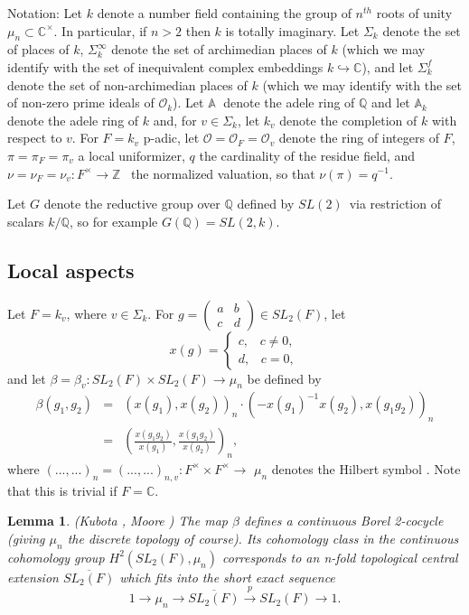 \documentclass[12pt]{article}
\numberwithin{equation}{section}
\newtheorem{lemma}[theorem]{Lemma}
\def\aaa{\mathbb{A}}
\def\qqq{\mathbb{Q}}
\def\ccc{\mathbb{C}}
\begin{document}
Notation: Let $k$ denote a number field containing the group of $n^{th}$
roots of unity $\mu _n\subset \ccc ^{\times }$. In particular, if $n>2$
then $k$ is totally imaginary. Let $\Sigma _k$ denote the set of places of $k
$, $\Sigma _k^\infty $ denote the set of archimedian places of $k$ (which we
may identify with the set of inequivalent complex embeddings $k\hookrightarrow 
\ccc $), and let $\Sigma _k^f$ denote the set of non-archimedian places of 
$k$ (which we may identify with the set of non-zero prime ideals of $%
{\mathcal{O}}_k$). Let $\aaa $ $\;$denote the adele ring of $\qqq$ and
let $\aaa _k$ denote the adele ring of $k$ and, for $v\in \Sigma _k$, let $%
k_v$ denote the completion of $k$ with respect to $v$. For $F=k_v$ p-adic,
let ${\mathcal{O}}={\mathcal{O}}_F={\mathcal{O}}_v$ denote the ring of integers of 
$F$, $\pi =\pi _F=\pi _v$ a local uniformizer, $q$ the cardinality of the
residue field, and $\nu =\nu _F=\nu _v:F^{\times }\rightarrow {\mathbb{Z}}$ \ the
normalized valuation, so that $\nu (\pi )=q^{-1}$.

Let $G$ denote the reductive group over $\qqq$ defined by $SL(2)$\ via
restriction of scalars $k/\qqq$, so for example $G(\qqq)=SL(2,k)$.

\subsection{Local aspects}\label{ssec:local}

Let $F=k_v$, where $v\in \Sigma _k$. For $g=\left( 
\begin{array}{cc}
a & b \\ 
c & d
\end{array}
\right) \in SL_2(F)$, let 
\[
x(g)=\left\{ 
\begin{array}{c}
c,\;\;\;c\neq 0, \\ 
d,\;\;\;c=0,
\end{array}
\right. 
\]
and let $\beta =\beta _v:SL_2(F)\times SL_2(F)\rightarrow \mu _n$ be defined
by 
\begin{eqnarray*}
\beta (g_1,g_2) &=&(x(g_1),x(g_2))_n\cdot (-x(g_1)^{-1}x(g_2),x(g_1g_2))_n \\
&=&(\frac{x(g_1g_2)}{x(g_1)},\frac{x(g_1g_2)}{x(g_2)})_n,
\end{eqnarray*}
where $(...,...)_n=(...,...)_{n,v}:F^{\times }\times F^{\times }\rightarrow $
$\mu _n$ denotes the Hilbert symbol \cite{W1}. Note that this is trivial if $F=%
\ccc $.

\begin{lemma}\label{lem:2.1}
(Kubota \cite{K1}, Moore \cite{M}) The map $\beta $ defines a continuous Borel
2-cocycle (giving $\mu _n$ the discrete topology of course). Its cohomology
class in the continuous cohomology group $H^2(SL_2(F),\mu _n)$ corresponds
to an n-fold topological central extension $\overline{SL_2(F)}$ which fits
into the short exact sequence 
\[
1\rightarrow \mu _n\rightarrow \overline{SL_2(F)}\stackrel{p}{\rightarrow }%
SL_2(F)\rightarrow 1.
\]
\end{lemma}
\end{document}
